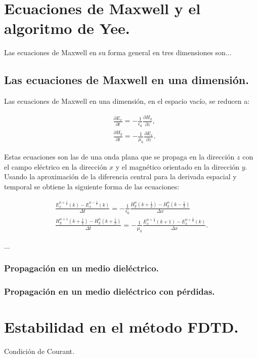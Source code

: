 \documentclass[12pt, oneside]{book}
\begin{document}
\chapter{Ecuaciones de Maxwell y el algoritmo de Yee.}

Las ecuaciones de Maxwell en su forma general en tres dimensiones son...



\section{Las ecuaciones de Maxwell en una dimensión.}
Las ecuaciones de Maxwell en una dimensión, en el espacio vacío, se reducen a:

\begin{align}
& \frac{\partial E_x}{\partial t}=-\frac{1}{\epsilon_0}  \frac{\partial H_y}{\partial z}, \\
& \frac{\partial H_y}{\partial t}=-\frac{1}{\mu_0} \frac{\partial E_x}{\partial z}.
\end{align}

Estas ecuaciones son las de una onda plana que se propaga en la dirección $z$ con el campo eléctrico en la dirección $x$ y el magnético orientado en la dirección $y$. Usando la aproximación de la diferencia central para la derivada espacial y temporal se obtiene la siguiente forma de las ecuaciones:

\begin{align}
 \frac{E_x^{n+\frac{1}{2}}(k)-E_x^{n-\frac{1}{2}}(k)}{\Delta t}=-\frac{1}{\epsilon_0}\frac{H_y^n \left(k+\frac{1}{2}\right) - H_y^n\left(k-\frac{1}{2}\right)}{\Delta x} \\
\frac{H_y^{n+1} \left(k+\frac{1}{2}\right) -H_y^{n}\left( k +\frac{1}{2}\right)}{\Delta t}=-\frac{1}{\mu_0}\frac{E_x^{n+\frac{1}{2}} \left(k+1\right) - E_x^{n+\frac{1}{2}}\left(k\right)}{\Delta x}.
\end{align}

...
\subsection{Propagación en un medio dieléctrico.}


\subsection{Propagación en un medio dieléctrico con pérdidas.}



\chapter{Estabilidad en el método FDTD.}
Condición de Courant.
\end{document}
